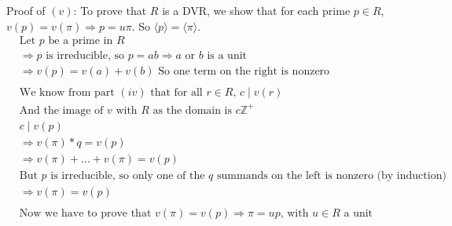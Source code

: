 \documentclass[11pt]{article}
\newcommand{\B}[1]{%
	\mathbb{#1}
}
\begin{document}
{  Proof of $(v)$:
  To prove that $R$ is a DVR, we show that for each prime $p \in R$, $v(p) = v(\pi) \Rightarrow p = u\pi$. So $\langle p \rangle = \langle \pi \rangle$.
  \begin{align*}
     & \text{Let $p$ be a prime in $R$}                                                                                                                 \\
     & \Rightarrow p \text{ is irreducible, so } p = ab \Rightarrow \text{$a$ or $b$ is a unit}                                                         \\
     & \Rightarrow v(p) = v(a) + v(b) \text{ So one term on the right is nonzero}                                                                       \\
     &                                                                                                                                                  \\
     & \text{We know from part $(iv)$ that for all $r \in R$, $c \mid v(r)$}                                                                            \\
     & \text{And the image of $v$ with $R$ as the domain is $c\B{Z}^+$}                                                                                 \\
     & c \mid v(p)                                                                                                                                      \\
     & \Rightarrow v(\pi)*q = v(p)                                                                                                                      \\
     & \Rightarrow v(\pi) + ... + v(\pi) = v(p)                                                                                                         \\
     & \text{But $p$ is irreducible, so only one of the $q$ summands on the left is nonzero (by induction)}                                             \\
     & \Rightarrow v(\pi) = v(p)                                                                                                                        \\
     &                                                                                                                                                  \\
     & \text{Now we have to prove that $v(\pi) = v(p) \Rightarrow \pi = up$, with $u \in R$ a unit}                                                     \\

\end{align*}}
\end{document}

